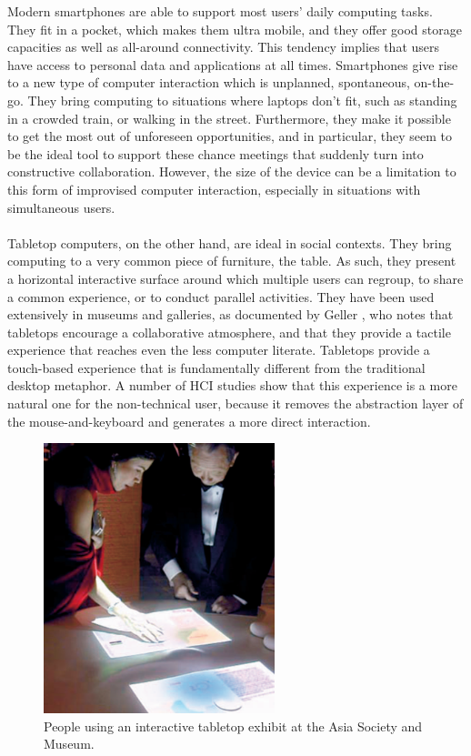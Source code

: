 Modern smartphones are able to support most users' daily computing tasks.
They fit in a pocket, which makes them ultra mobile, and they offer good storage capacities as well as all-around connectivity.
This tendency implies that users have access to personal data and applications at all times.
Smartphones give rise to a new type of computer interaction which is unplanned, spontaneous, on-the-go.
They bring computing to situations where laptops don't fit, such as standing in a crowded train, or walking in the street.
Furthermore, they make it possible to get the most out of unforeseen opportunities, and in particular, they seem to be the ideal tool to support these chance meetings that suddenly turn into constructive collaboration.
However, the size of the device can be a limitation to this form of improvised computer interaction, especially in situations with simultaneous users. 
\\\\
Tabletop computers, on the other hand, are ideal in social contexts.
They bring computing to a very common piece of furniture, the table.
As such, they present a horizontal interactive surface around which multiple users can regroup, to share a common experience, or to conduct parallel activities.
They have been used extensively in museums and galleries, as documented by Geller \citep{Geller:2006:exhibits}, who notes that tabletops encourage a collaborative atmosphere, and that they provide a tactile experience that reaches even the less computer literate.
Tabletops provide a touch-based experience that is fundamentally different from the traditional desktop metaphor.
A number of HCI studies show that this experience is a more natural one for the non-technical user, because it removes the abstraction layer of the mouse-and-keyboard and generates a more direct interaction.

\begin{figure}[htb]
  \centering
    \includegraphics[width=0.6\textwidth]{images/visitors}
  \caption{People using an interactive tabletop exhibit at the Asia Society and Museum.}
  \label{visitors}
\end{figure}

